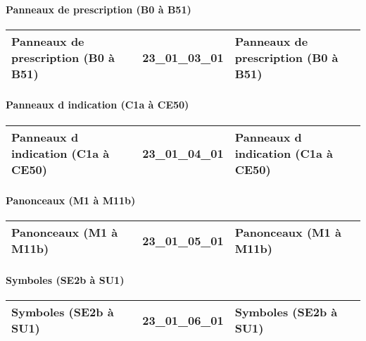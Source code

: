 \documentclass[12pt,titlepage,oneside]{book}
\begin{document}
\paragraph{Panneaux de prescription (B0 à B51)}
\noindent
\vspace{\baselineskip}

\renewcommand{\arraystretch}{1.2}
\begin{supertabular}{|p{10cm}|c|p{15cm}|}
 Panneaux de prescription (B0 à B51) & 23\_01\_03\_01 & Panneaux de prescription (B0 à B51)\\
\hline
\end{supertabular}


\paragraph{Panneaux d indication (C1a à CE50)}
\noindent
\vspace{\baselineskip}

\renewcommand{\arraystretch}{1.2}
\begin{supertabular}{|p{10cm}|c|p{15cm}|}
 Panneaux d indication (C1a à CE50) & 23\_01\_04\_01 & Panneaux d indication (C1a à CE50)\\
\hline
\end{supertabular}


\paragraph{Panonceaux (M1 à M11b)}
\noindent
\vspace{\baselineskip}

\renewcommand{\arraystretch}{1.2}
\begin{supertabular}{|p{10cm}|c|p{15cm}|}
 Panonceaux (M1 à M11b) & 23\_01\_05\_01 & Panonceaux (M1 à M11b)\\
\hline
\end{supertabular}


\paragraph{Symboles (SE2b à SU1)}
\noindent
\vspace{\baselineskip}

\renewcommand{\arraystretch}{1.2}
\begin{supertabular}{|p{10cm}|c|p{15cm}|}
 Symboles (SE2b à SU1) & 23\_01\_06\_01 & Symboles (SE2b à SU1)\\
\hline
\end{supertabular}
\end{document}
